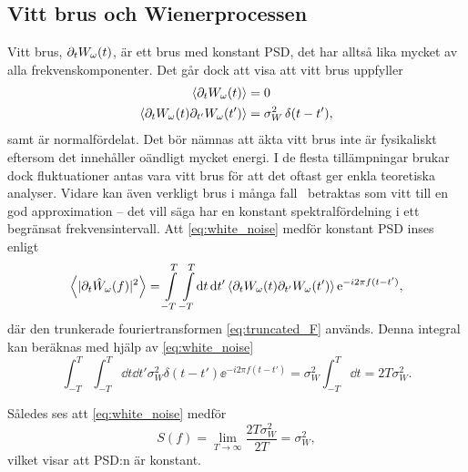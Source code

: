 \subsection{Vitt brus och Wienerprocessen}\label{sec:white_noise}
Vitt brus, $\partial_tW_\omega(t)$,\footnotemark{} är ett brus med konstant PSD, det har alltså lika mycket av alla frekvenskomponenter. Det går dock att visa att vitt brus uppfyller \cite{Miller_probability2012}
\begin{equation}\label{eq:white_noise}
\begin{aligned}
\ev{\pd_tW_\omega(t)}&=0 \\
\ev{\pd_tW_\omega(t)\pd_{t'}W_\omega(t')}&= \sigma_W^2 \, \delta(t-t'),
\end{aligned}
\end{equation}
samt är normalfördelat. 
Det bör nämnas att äkta vitt brus inte är fysikaliskt eftersom det innehåller oändligt mycket energi. I de flesta tillämpningar brukar dock fluktuationer antas vara vitt brus för att det oftast ger enkla teoretiska analyser. Vidare kan även verkligt brus i många fall~\cite{Engelberg_noise2007} betraktas som vitt till en god approximation -- det vill säga har en konstant spektralfördelning i ett begränsat frekvensintervall. Att \eqref{eq:white_noise} medför konstant PSD inses enligt  
\begin{equation}
    \ev{|\pd_t\hat{W}_\omega(f)|^2} =
    \int_{-T}^{T}\int_{-T}^{T}\!\dd{t}\dd{t'}
    \ev{\pd_tW_\omega(t)\pd_{t'}W_\omega(t')}\ee^{-i2\pi f(t-t')},
\end{equation}
där den trunkerade fouriertransformen \eqref{eq:truncated_F} används. Denna integral kan beräknas med hjälp av \eqref{eq:white_noise}
\begin{equation}
    \int_{-T}^{T}\int_{-T}^{T}\!\dd{t}\dd{t'} 
    \sigma_W^2 \delta(t-t')\ee^{-i2\pi f(t-t')} 
    = \sigma_W^2 \int_{-T}^{T}\dd{t} =2T\sigma_W^2.
\end{equation}

Således ses att \eqref{eq:white_noise} medför 
\begin{equation}
    S(f) = \lim_{T\to\infty}\dfrac{2T\sigma_W^2}{2T} = \sigma_W^2,
\end{equation}
vilket visar att PSD:n är konstant. 



